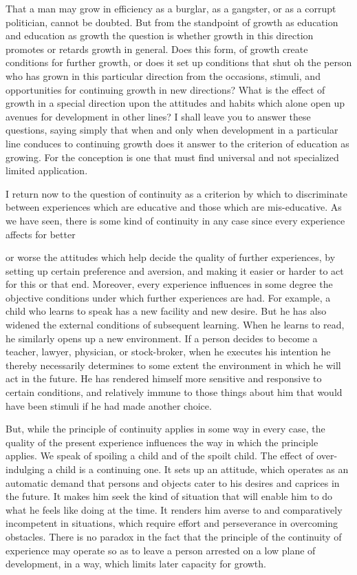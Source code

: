 That a man may grow in efficiency as a burglar, as a gangster, or as a corrupt 
politician, cannot be doubted. But from the standpoint of growth as education and 
education as growth the question is whether growth in this direction promotes or retards 
growth in general. Does this form, of growth create conditions for further growth, or does 
it set up conditions that shut oh the person who has grown in this particular direction 
from the occasions, stimuli, and opportunities for continuing growth in new directions? 
What is the effect of growth in a special direction upon the attitudes and habits which 
alone open up avenues for development in other lines? I shall leave you to answer these 
questions, saying simply that when and only when development in a particular line 
conduces to continuing growth does it answer to the criterion of education as growing. 
For the conception is one that must find universal and not specialized limited application. 

I return now to the question of continuity as a criterion by which to discriminate 
between experiences which are educative and those which are mis-educative. As we have 
seen, there is some kind of continuity in any case since every experience affects for better 



or worse the attitudes which help decide the quality of further experiences, by setting up 
certain preference and aversion, and making it easier or harder to act for this or that end. 
Moreover, every experience influences in some degree the objective conditions under 
which further experiences are had. For example, a child who learns to speak has a new 
facility and new desire. But he has also widened the external conditions of subsequent 
learning. When he learns to read, he similarly opens up a new environment. If a person 
decides to become a teacher, lawyer, physician, or stock-broker, when he executes his 
intention he thereby necessarily determines to some extent the environment in which he 
will act in the future. He has rendered himself more sensitive and responsive to certain 
conditions, and relatively immune to those things about him that would have been stimuli 
if he had made another choice. 

But, while the principle of continuity applies in some way in every case, the quality of 
the present experience influences the way in which the principle applies. We speak of 
spoiling a child and of the spoilt child. The effect of over-indulging a child is a 
continuing one. It sets up an attitude, which operates as an automatic demand that persons 
and objects cater to his desires and caprices in the future. It makes him seek the kind of 
situation that will enable him to do what he feels like doing at the time. It renders him 
averse to and comparatively incompetent in situations, which require effort and 
perseverance in overcoming obstacles. There is no paradox in the fact that the principle 
of the continuity of experience may operate so as to leave a person arrested on a low 
plane of development, in a way, which limits later capacity for growth. 


